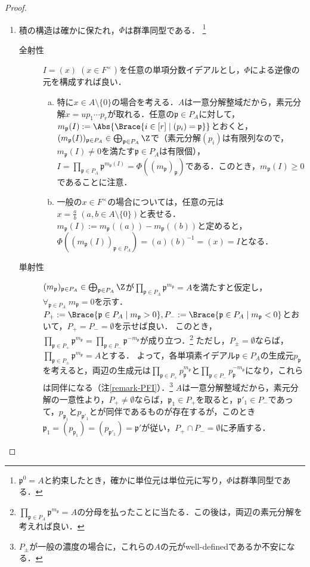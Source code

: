 \documentclass[uplatex,dvipdfmx]{jsreport}
\renewcommand{\p}{\mathfrak{p}}
\begin{document}
\begin{proof}\mbox{}
    \begin{enumerate}
        \item 積の構造は確かに保たれ，$\Phi$は群準同型である．
        \footnote{$\p^0=A$と約束したとき，確かに単位元は単位元に写り，$\Phi$は群準同型である．}
        \begin{description}
            \item[全射性] $I=(x)\;(x\in F^\times)$を任意の単項分数イデアルとし，$\Phi$による逆像の元を構成すれば良い．
            \begin{enumerate}[(a)]
                \item 特に$x\in A\setminus\{0\}$の場合を考える．$A$は一意分解整域だから，素元分解$x=up_1\cdots p_r$が取れる．任意の$\p\in P_A$に対して，$m_\p(I):=\Abs{\Brace{i\in[r]\mid(p_i)=\p}}$とおくと，$(m_\p(I))_{\p\in P_A}\in\bigoplus_{\p\in P_A}\Z$で（素元分解$(p_i)$は有限列なので，$m_\p(I)\ne 0$を満たす$\p\in P_A$は有限個），$I=\prod_{\p\in P_A}\p^{m_\p(I)}=\Phi((m_\p)_\p)$である．このとき，$m_\p(I)\ge 0$であることに注意．
                \item 一般の$x\in F^\times$の場合については，任意の元は$x=\frac{a}{b}\;(a,b\in A\setminus\{0\})$と表せる．$m_\p(I):=m_\p((a))-m_\p((b))$と定めると，$\Phi((m_\p(I))_{\p\in P_A})=(a)(b)^{-1}=(x)=I$となる．
            \end{enumerate}
            \item[単射性] 
            $(m_\p)_{\p\in P_A}\in\bigoplus_{\p\in P_A}\Z$が$\prod_{\p\in P_A}\p^{m_\p}=A$を満たすと仮定し，$\forall_{\p\in P_A}\;m_\p=0$を示す．
            $P_+:=\Brace{\p\in P_A\mid m_\p>0},P_-:=\Brace{\p\in P_A\mid m_\p<0}$とおいて，$P_+=P_-=\emptyset$を示せば良い．
            このとき，$\prod_{\p\in P_+}\p^{m_\p}=\prod_{\p\in P_-}\p^{-m_\p}$が成り立つ．\footnote{$\prod_{\p\in P_A}\p^{m_\p}=A$の分母を払ったことに当たる．この後は，両辺の素元分解を考えれば良い．}
            ただし，$P_\pm=\emptyset$ならば，$\prod_{\p\in P_\pm}\p^{m_\p}=A$とする．
            よって，各単項素イデアル$\p\in P_A$の生成元$p_\p$を考えると，両辺の生成元は$\prod_{\p\in P_+}p_\p^{m_\p}$と$\prod_{\p\in P_-}p_\p^{-m_\p}$になり，これらは同伴になる（注\ref{remark-PFI}）．\footnote{$P_\pm$が一般の濃度の場合に，これらの$A$の元がwell-definedであるか不安になる．}
            $A$は一意分解整域だから，素元分解の一意性より，$P_+\ne\emptyset$ならば，$\p_1\in P_+$を取ると，$\p'_1\in P_-$であって，$p_{\p_1}$と$p_{\p'_1}$とが同伴であるものが存在するが，このとき$\p_1=(p_{\p_1})=(p_{\p'_1})=\p'$が従い，$P_+\cap P_-=\emptyset$に矛盾する．

\end{description}
\end{enumerate}
\end{proof}
\end{document}
